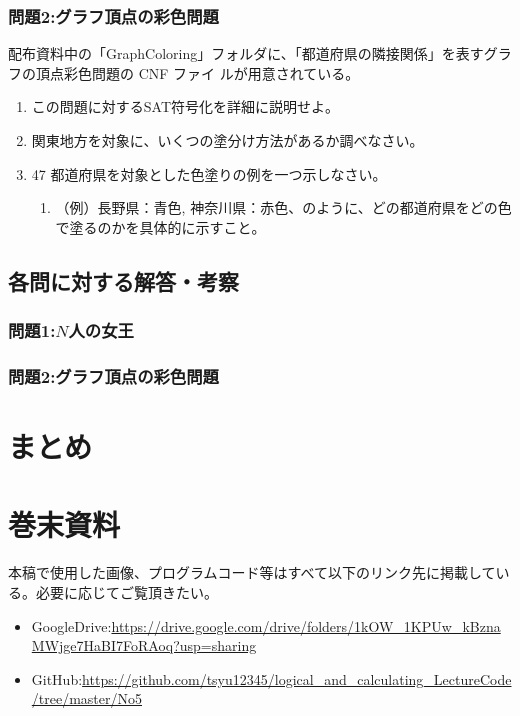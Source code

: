 \documentclass[dvipdfmx]{jsarticle}
\begin{document}
\subsubsection{問題2:グラフ頂点の彩色問題}
配布資料中の「GraphColoring」フォルダに、「都道府県の隣接関係」を表すグラフの頂点彩色問題の CNF ファイ
ルが用意されている。
\begin{enumerate}
  \item この問題に対するSAT符号化を詳細に説明せよ。
  \item 関東地方を対象に、いくつの塗分け方法があるか調べなさい。
  \item 47 都道府県を対象とした色塗りの例を一つ示しなさい。
  \begin{enumerate}
    \item （例）長野県：青色, 神奈川県：赤色、のように、どの都道府県をどの色で塗るのかを具体的に示すこと。
  \end{enumerate}
\end{enumerate}
\subsection{各問に対する解答・考察}
\subsubsection{問題1:$N$人の女王}
\subsubsection{問題2:グラフ頂点の彩色問題}
\section{まとめ}
\section{巻末資料}
本稿で使用した画像、プログラムコード等はすべて以下のリンク先に掲載している。必要に応じてご覧頂きたい。
\begin{itemize}
  \item GoogleDrive:\url{https://drive.google.com/drive/folders/1kOW_1KPUw_kBznaMWjge7HaBI7FoRAoq?usp=sharing}
  \item GitHub:\url{https://github.com/tsyu12345/logical_and_calculating_LectureCode/tree/master/No5}
\end{itemize}
\end{document}
